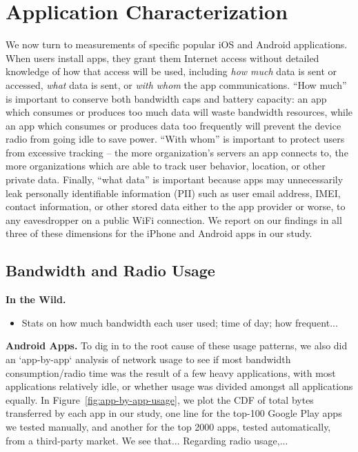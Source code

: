 \section{Application Characterization}
\label{sec:characterize-app}

  We now turn to measurements of specific popular iOS and Android applications. 
  When users install apps, they grant them Internet access without detailed knowledge of how that access will be used, including {\it how much} data is sent or accessed, {\it what} data is sent,  or {\it with whom} the app communications.
  ``How much'' is important to conserve both bandwidth caps and battery capacity: an app which consumes or produces too much data will waste bandwidth resources, while an app which consumes or produces data too frequently will prevent the device radio from going idle to save power.
  ``With whom'' is important to protect users from excessive tracking -- the more organization's servers an app connects to, the more organizations which are able to track user behavior, location, or other private data.
  Finally, ``what data'' is important because apps may unnecessarily leak personally identifiable information (PII) such as user email address, IMEI, contact information, or other stored data either to the app provider or worse, to any eavesdropper on a public WiFi connection.
  We  report on our findings in all three of these dimensions for the iPhone and Android apps in our study.

\subsection{Bandwidth and Radio Usage}

  {\bf In the Wild.}
    \begin{itemize}
      \item Stats on how much bandwidth each user used; time of day; how frequent...
    \end{itemize}

  {\bf Android Apps.}
    To dig in to the root cause of these usage patterns, we also did an `app-by-app` analysis of network usage to see if most bandwidth consumption/radio time was the result of a few heavy applications, with most applications relatively idle, or whether usage was divided amongst all applications equally.
    In Figure~\ref{fig:app-by-app-usage}, we plot the CDF of total bytes transferred by each app in our study, one line for the top-100 Google Play apps we tested manually, and another for the top 2000 apps, tested automatically, from a third-party market.
    We see that...
    Regarding radio usage,...

